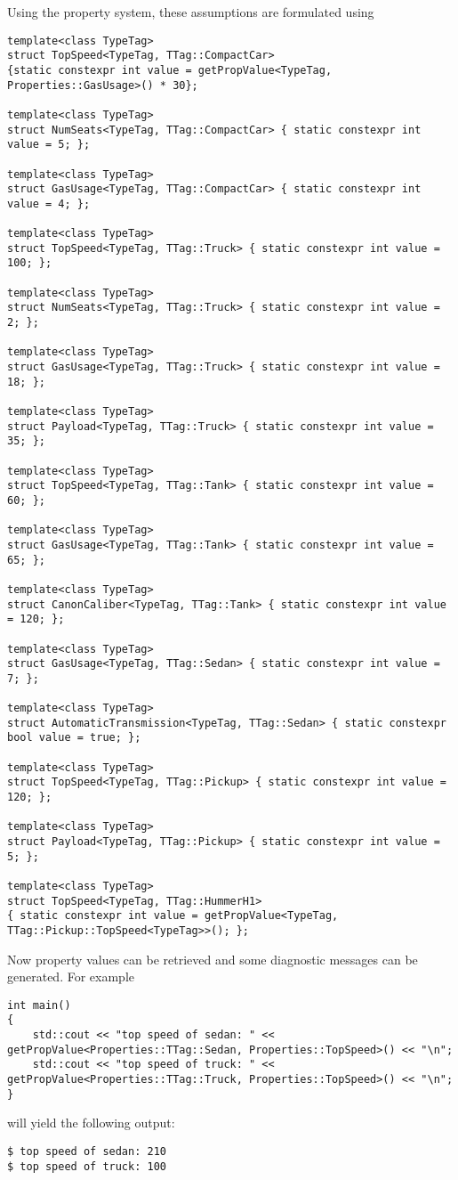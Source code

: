 \noindent
Using the \Dumux property system, these assumptions are formulated
using
\begin{lstlisting}[name=propsyscars,style=DumuxCode]
template<class TypeTag>
struct TopSpeed<TypeTag, TTag::CompactCar>
{static constexpr int value = getPropValue<TypeTag, Properties::GasUsage>() * 30};

template<class TypeTag>
struct NumSeats<TypeTag, TTag::CompactCar> { static constexpr int value = 5; };

template<class TypeTag>
struct GasUsage<TypeTag, TTag::CompactCar> { static constexpr int value = 4; };

template<class TypeTag>
struct TopSpeed<TypeTag, TTag::Truck> { static constexpr int value = 100; };

template<class TypeTag>
struct NumSeats<TypeTag, TTag::Truck> { static constexpr int value = 2; };

template<class TypeTag>
struct GasUsage<TypeTag, TTag::Truck> { static constexpr int value = 18; };

template<class TypeTag>
struct Payload<TypeTag, TTag::Truck> { static constexpr int value = 35; };

template<class TypeTag>
struct TopSpeed<TypeTag, TTag::Tank> { static constexpr int value = 60; };

template<class TypeTag>
struct GasUsage<TypeTag, TTag::Tank> { static constexpr int value = 65; };

template<class TypeTag>
struct CanonCaliber<TypeTag, TTag::Tank> { static constexpr int value = 120; };

template<class TypeTag>
struct GasUsage<TypeTag, TTag::Sedan> { static constexpr int value = 7; };

template<class TypeTag>
struct AutomaticTransmission<TypeTag, TTag::Sedan> { static constexpr bool value = true; };

template<class TypeTag>
struct TopSpeed<TypeTag, TTag::Pickup> { static constexpr int value = 120; };

template<class TypeTag>
struct Payload<TypeTag, TTag::Pickup> { static constexpr int value = 5; };

template<class TypeTag>
struct TopSpeed<TypeTag, TTag::HummerH1>
{ static constexpr int value = getPropValue<TypeTag, TTag::Pickup::TopSpeed<TypeTag>>(); };
\end{lstlisting}

\noindent
Now property values can be retrieved and some diagnostic messages can
be generated. For example
\begin{lstlisting}[name=propsyscars,style=DumuxCode]
int main()
{
    std::cout << "top speed of sedan: " << getPropValue<Properties::TTag::Sedan, Properties::TopSpeed>() << "\n";
    std::cout << "top speed of truck: " << getPropValue<Properties::TTag::Truck, Properties::TopSpeed>() << "\n";
}
\end{lstlisting}
will yield the following output:
\begin{lstlisting}[style=Bash, basicstyle=\ttfamily\scriptsize\let\textcolor\textcolordummy]
$ top speed of sedan: 210
$ top speed of truck: 100
\end{lstlisting}
